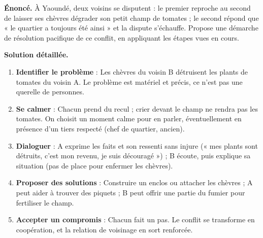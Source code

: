 \documentclass[11pt]{article}
\begin{document}
\begin{exoresolu}
\textbf{Énoncé.} À Yaoundé, deux voisins se disputent : le premier reproche au second de laisser ses chèvres dégrader son petit champ de tomates ; le second répond que « le quartier a toujours été ainsi » et la dispute s'échauffe. Propose une démarche de résolution pacifique de ce conflit, en appliquant les étapes vues en cours.

\tcblower
\textbf{Solution détaillée.}
\begin{enumerate}
\item \textbf{Identifier le problème} : Les chèvres du voisin B détruisent les plants de tomates du voisin A. Le problème est matériel et précis, ce n'est pas une querelle de personnes.
\item \textbf{Se calmer} : Chacun prend du recul ; crier devant le champ ne rendra pas les tomates. On choisit un moment calme pour en parler, éventuellement en présence d'un tiers respecté (chef de quartier, ancien).
\item \textbf{Dialoguer} : A exprime les faits et son ressenti sans injure (« mes plants sont détruits, c'est mon revenu, je suis découragé ») ; B écoute, puis explique sa situation (pas de place pour enfermer les chèvres).
\item \textbf{Proposer des solutions} : Construire un enclos ou attacher les chèvres ; A peut aider à trouver des piquets ; B peut offrir une partie du fumier pour fertiliser le champ.
\item \textbf{Accepter un compromis} : Chacun fait un pas. Le conflit se transforme en coopération, et la relation de voisinage en sort renforcée.
\end{enumerate}
\end{exoresolu}
\end{document}
